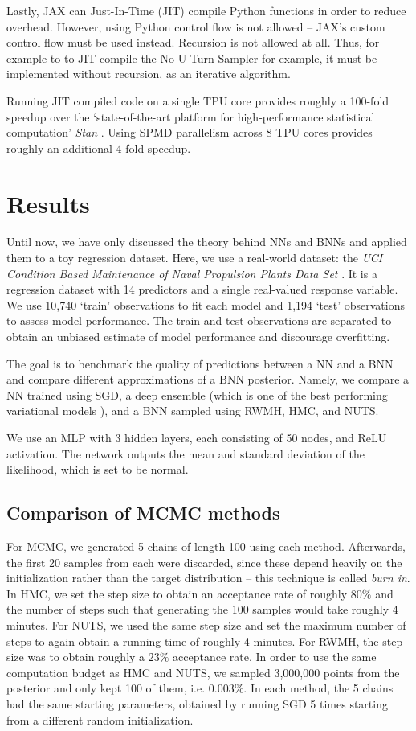 \documentclass[12pt]{article}
\begin{document}
{Lastly, JAX can Just-In-Time (JIT) compile Python functions in order to reduce overhead. However, using Python control flow is not allowed -- JAX's custom control flow must be used instead. Recursion is not allowed at all. Thus, for example to to JIT compile the No-U-Turn Sampler for example, it must be implemented without recursion, as an iterative algorithm.

Running JIT compiled code on a single TPU core provides roughly a 100-fold speedup over the `state-of-the-art platform for high-performance statistical computation' \textit{Stan} \cite{stan}. Using SPMD parallelism across 8 TPU cores provides roughly an additional 4-fold speedup.

\section{Results}
\label{sec_results}

Until now, we have only discussed the theory behind NNs and BNNs and applied them to a toy regression dataset. Here, we use a real-world dataset: the \textit{UCI Condition Based Maintenance of Naval Propulsion Plants Data Set} \cite{uci}. It is a regression dataset with 14 predictors and a single real-valued response variable. We use 10,740 `train' observations to fit each model and 1,194 `test' observations to assess model performance. The train and test observations are separated to obtain an unbiased estimate of model performance and discourage overfitting.

The goal is to benchmark the quality of predictions between a NN and a BNN and compare different approximations of a BNN posterior. Namely, we compare a NN trained using SGD, a deep ensemble (which is one of the best performing variational models \cite{bnn_posterior}), and a BNN sampled using RWMH, HMC, and NUTS.

We use an MLP with 3 hidden layers, each consisting of 50 nodes, and ReLU activation. The network outputs the mean and standard deviation of the likelihood, which is set to be normal.

\subsection{Comparison of MCMC methods}

For MCMC, we generated 5 chains of length 100 using each method. Afterwards, the first 20 samples from each were discarded, since these depend heavily on the initialization rather than the target distribution -- this technique is called \textit{burn in}. In HMC, we set the step size to obtain an acceptance rate of roughly $80\%$ and the number of steps such that generating the 100 samples would take roughly 4 minutes. For NUTS, we used the same step size and set the maximum number of steps to again obtain a running time of roughly 4 minutes. For RWMH, the step size was to obtain roughly a $23\%$ acceptance rate. In order to use the same computation budget as HMC and NUTS, we sampled 3,000,000 points from the posterior and only kept 100 of them, i.e. $0.003\%$. In each method, the 5 chains had the same starting parameters, obtained by running SGD 5 times starting from a different random initialization.

}
\end{document}
